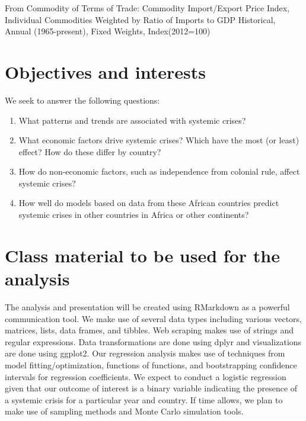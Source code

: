 \documentclass[
]{article}
\begin{document}
From Commodity of Terms of Trade: Commodity Import/Export Price Index,
Individual Commodities Weighted by Ratio of Imports to GDP Historical,
Annual (1965-present), Fixed Weights, Index(2012=100)

\hypertarget{objectives-and-interests}{%
\section{Objectives and interests}\label{objectives-and-interests}}

We seek to answer the following questions:

\begin{enumerate}
\def\labelenumi{\arabic{enumi}.}
\item
  What patterns and trends are associated with systemic crises?
\item
  What economic factors drive systemic crises? Which have the most (or
  least) effect? How do these differ by country?
\item
  How do non-economic factors, such as independence from colonial rule,
  affect systemic crises?
\item
  How well do models based on data from these African countries predict
  systemic crises in other countries in Africa or other continents?
\end{enumerate}

\hypertarget{class-material-to-be-used-for-the-analysis}{%
\section{Class material to be used for the
analysis}\label{class-material-to-be-used-for-the-analysis}}

The analysis and presentation will be created using RMarkdown as a
powerful communication tool. We make use of several data types including
various vectors, matrices, lists, data frames, and tibbles. Web scraping
makes use of strings and regular expressions. Data transformations are
done using dplyr and visualizations are done using ggplot2. Our
regression analysis makes use of techniques from model
fitting/optimization, functions of functions, and bootstrapping
confidence intervals for regression coefficients. We expect to conduct a
logistic regression given that our outcome of interest is a binary
variable indicating the presence of a systemic crisis for a particular
year and country. If time allows, we plan to make use of sampling
methods and Monte Carlo simulation tools.
\end{document}
